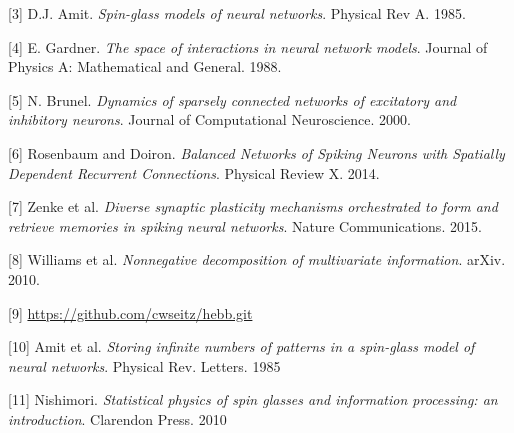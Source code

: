 \documentclass{article} %
\begin{document}
[3] D.J. Amit. \textit{Spin-glass models of neural networks}. Physical Rev A. 1985.

[4] E. Gardner. \textit{The space of interactions in neural network models}. Journal of Physics A: Mathematical and General. 1988.

[5] N. Brunel. \textit{Dynamics of sparsely connected networks of excitatory and inhibitory neurons}. Journal of Computational Neuroscience. 2000. 

[6] Rosenbaum and Doiron. \textit{Balanced Networks of Spiking Neurons with Spatially Dependent Recurrent Connections}. Physical Review X. 2014.

[7] Zenke et al. \textit{Diverse synaptic plasticity mechanisms
orchestrated to form and retrieve memories
in spiking neural networks}. Nature Communications. 2015.

[8] Williams et al. \textit{Nonnegative decomposition of multivariate information}. arXiv. 2010.

[9] \url{https://github.com/cwseitz/hebb.git}

[10] Amit et al. \textit{Storing infinite numbers of patterns in a spin-glass model of neural networks}. Physical Rev. Letters. 1985

[11] Nishimori. \textit{Statistical physics of spin glasses and information processing: an introduction}. Clarendon Press. 2010
\end{document}
